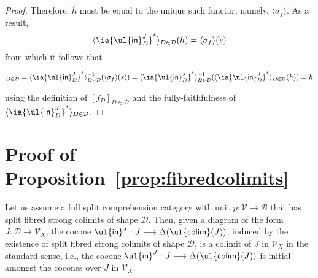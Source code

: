 \begin{proof}
Therefore, $\widehat{h}$ must be equal to the unique such functor, namely, $\langle \sigma_f \rangle$. 
As a result,
\[
\langle \ia {\mathsf{\ul{in}}^J_D}^* \rangle_{D \in \mathcal{D}}(h) = \langle \sigma_f \rangle(s)
\]
from which it follows that 
\begin{fleqn}[0.3cm]
\begin{align*}
[f_D]_{D \in \mathcal{D}} = \langle \ia {\mathsf{\ul{in}}^J_D}^* \rangle_{D \in \mathcal{D}}^{-1}(\langle \sigma_f \rangle(s)) = \langle \ia {\mathsf{\ul{in}}^J_D}^* \rangle_{D \in \mathcal{D}}^{-1}(\langle \ia {\mathsf{\ul{in}}^J_D}^* \rangle_{D \in \mathcal{D}}(h)) = h
\end{align*}
\end{fleqn}
using the definition of $[f_D]_{D \in \mathcal{D}}$ and the fully-faithfulness of $\langle \ia {\mathsf{\ul{in}}^J_D}^* \rangle_{D \in \mathcal{D}}$. 
\end{proof}


\section{Proof of Proposition~\ref{prop:fibredcolimits}}
\label{sect:proofofprop:fibredcolimits}

{
\renewcommand{\thetheorem}{\ref{prop:fibredcolimits}}
\begin{proposition}
Let us assume a full split comprehension category with unit \linebreak $p : \mathcal{V} \longrightarrow \mathcal{B}$ that has split fibred strong colimits of shape $\mathcal{D}$. Then, given a diagram of the form $J : \mathcal{D} \longrightarrow \mathcal{V}_X$, the cocone $\mathsf{\ul{in}}^{J} : J \longrightarrow \Delta(\mathsf{\ul{colim}}(J))$, induced by the existence of split fibred strong colimits of shape $\mathcal{D}$, is a colimit of $J$ in $\mathcal{V}_X$ in the standard sense, i.e., the cocone $\mathsf{\ul{in}}^{J} : J \longrightarrow \Delta(\mathsf{\ul{colim}}(J))$ is initial amongst the cocones over $J$ in $\mathcal{V}_X$.
\end{proposition}
\addtocounter{theorem}{-1}
}

